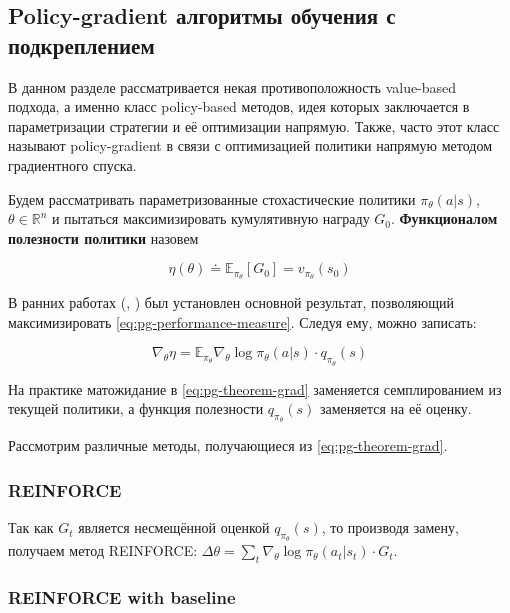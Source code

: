 \documentclass[12pt,a4paper]{amsart}
\begin{document}
\subsection{Policy-gradient алгоритмы обучения с подкреплением}

В данном разделе рассматривается некая противоположность value-based подхода, а именно класс policy-based методов, идея которых заключается в параметризации стратегии и её оптимизации напрямую. Также, часто этот класс называют policy-gradient в связи с оптимизацией политики напрямую методом градиентного спуска.

Будем рассматривать параметризованные стохастические политики $\pi_{\theta}(a|s)$, $\theta \in \mathbb{R}^n$ и пытаться максимизировать кумулятивную награду $G_0$. \textbf{Функционалом полезности политики} назовем

\begin{equation} \label{eq:pg-performance-measure}
\eta(\theta) \doteq \mathbb{E}_{\pi_{\theta}}[G_0] = v_{\pi_{\theta}}(s_0)
\end{equation}


В ранних работах (\cite{sutton1998reinforcement}, \cite{sutton1999policy}) был установлен основной результат, позволяющий максимизировать \eqref{eq:pg-performance-measure}. Следуя ему, можно записать:

\begin{equation} \label{eq:pg-theorem-grad}
\nabla_\theta \eta = \mathbb{E}_{\pi_{\theta}} \nabla_\theta \log \pi_{\theta} (a | s) \cdot q_{\pi_{\theta}}(s)
\end{equation}

На практике матожидание в \eqref{eq:pg-theorem-grad} заменяется семплированием из текущей политики, а функция полезности $q_{\pi_{\theta}}(s)$ заменяется на её оценку.

Рассмотрим различные методы, получающиеся из \eqref{eq:pg-theorem-grad}.

\subsubsection*{\textbf{REINFORCE}}

Так как $G_t$ является несмещённой оценкой $q_{\pi_{\theta}}(s)$, то производя замену, получаем метод REINFORCE: $\Delta \theta = \sum_{t} \nabla_\theta \log \pi_{\theta} (a_t | s_t) \cdot G_t$.

\subsubsection*{\textbf{REINFORCE with baseline}}
\end{document}
